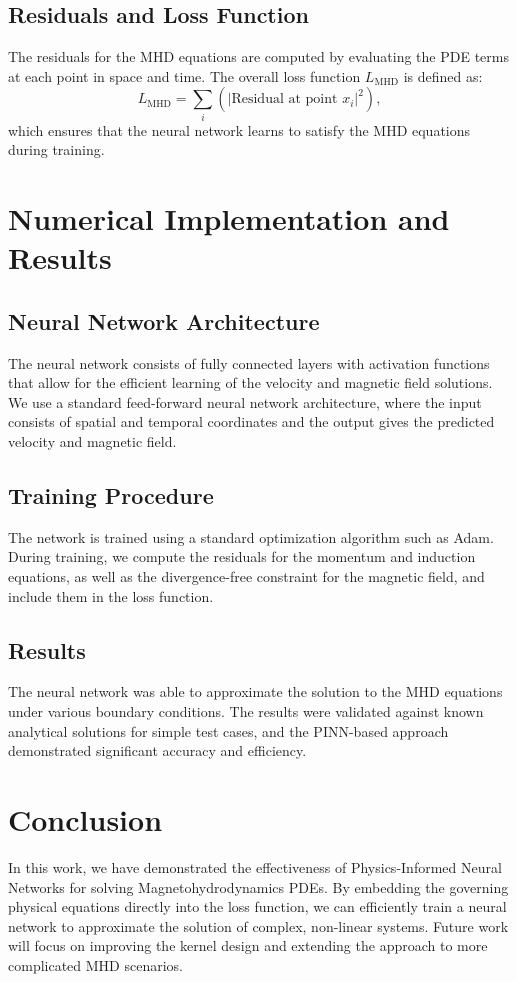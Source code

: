 \documentclass[12pt]{article}
\begin{document}
\subsection{Residuals and Loss Function}
The residuals for the MHD equations are computed by evaluating the PDE terms at each point in space and time. The overall loss function \( L_{\text{MHD}} \) is defined as:
\begin{equation}
L_{\text{MHD}} = \sum_i \left( \left| \text{Residual at point } x_i \right|^2 \right),
\end{equation}
which ensures that the neural network learns to satisfy the MHD equations during training.

\section{Numerical Implementation and Results}
\subsection{Neural Network Architecture}
The neural network consists of fully connected layers with activation functions that allow for the efficient learning of the velocity and magnetic field solutions. We use a standard feed-forward neural network architecture, where the input consists of spatial and temporal coordinates and the output gives the predicted velocity and magnetic field.

\subsection{Training Procedure}
The network is trained using a standard optimization algorithm such as Adam. During training, we compute the residuals for the momentum and induction equations, as well as the divergence-free constraint for the magnetic field, and include them in the loss function.

\subsection{Results}
The neural network was able to approximate the solution to the MHD equations under various boundary conditions. The results were validated against known analytical solutions for simple test cases, and the PINN-based approach demonstrated significant accuracy and efficiency.

\section{Conclusion}
In this work, we have demonstrated the effectiveness of Physics-Informed Neural Networks for solving Magnetohydrodynamics PDEs. By embedding the governing physical equations directly into the loss function, we can efficiently train a neural network to approximate the solution of complex, non-linear systems. Future work will focus on improving the kernel design and extending the approach to more complicated MHD scenarios.




\end{document}
